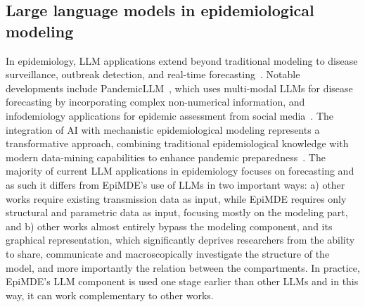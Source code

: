 \subsection{Large language models in epidemiological modeling}

In epidemiology, LLM applications extend beyond traditional modeling to disease surveillance, outbreak detection, and real-time forecasting~\cite{b12}. Notable developments include PandemicLLM~\cite{b14}, which uses multi-modal LLMs for disease forecasting by incorporating complex non-numerical information, and infodemiology applications for epidemic assessment from social media~\cite{b15,b16}. The integration of AI with mechanistic epidemiological modeling represents a transformative approach, combining traditional epidemiological knowledge with modern data-mining capabilities to enhance pandemic preparedness~\cite{b17}. The majority of current LLM applications in epidemiology focuses on forecasting and as such it differs from EpiMDE's use of LLMs in two important ways: a) other works require existing transmission data as input, while EpiMDE requires only structural and parametric data as input, focusing mostly on the modeling part, and b) other works almost entirely bypass the modeling component, and its graphical representation, which significantly deprives researchers from the ability to share, communicate and macroscopically investigate the structure of the model, and more importantly the relation between the compartments. In practice, EpiMDE's LLM component is used one stage earlier than other LLMs and in this way, it can work complementary to other works.

